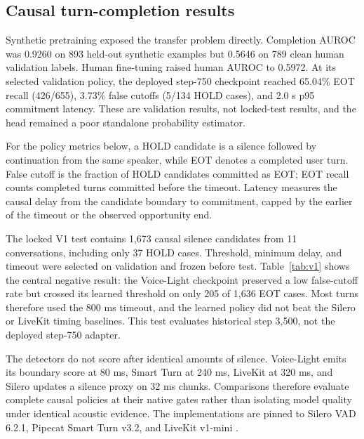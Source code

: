 \documentclass[10pt,twocolumn]{article}
\begin{document}
\subsection{Causal turn-completion results}

Synthetic pretraining exposed the transfer problem directly. Completion AUROC was 0.9260 on 893
held-out synthetic examples but 0.5646 on 789 clean human validation labels. Human fine-tuning
raised human AUROC to 0.5972. At its selected validation policy, the deployed step-750 checkpoint
reached 65.04\% EOT recall (426/655), 3.73\% false cutoffs (5/134 HOLD cases), and 2.0 s p95
commitment latency. These are validation results, not locked-test results, and the head remained a
poor standalone probability estimator.

For the policy metrics below, a HOLD candidate is a silence followed by continuation from the same
speaker, while EOT denotes a completed user turn. False cutoff is the fraction of HOLD candidates
committed as EOT; EOT recall counts completed turns committed before the timeout. Latency measures
the causal delay from the candidate boundary to commitment, capped by the earlier of the timeout or
the observed opportunity end.

The locked V1 test contains 1,673 causal silence candidates from 11 conversations, including only
37 HOLD cases. Threshold, minimum delay, and timeout were selected on validation and frozen before
test. Table~\ref{tab:v1} shows the central negative result: the Voice-Light checkpoint preserved a
low false-cutoff rate but crossed its learned threshold on only 205 of 1,636 EOT cases. Most turns
therefore used the 800 ms timeout, and the learned policy did not beat the Silero or LiveKit timing
baselines. This test evaluates historical step 3,500, not the deployed step-750 adapter.

The detectors do not score after identical amounts of silence. Voice-Light emits its boundary score
at 80 ms, Smart Turn at 240 ms, LiveKit at 320 ms, and Silero updates a silence proxy on 32 ms
chunks. Comparisons therefore evaluate complete causal policies at their native gates rather than
isolating model quality under identical acoustic evidence. The implementations are pinned to
Silero VAD 6.2.1, Pipecat Smart Turn v3.2, and LiveKit v1-mini \cite{silero,smartturn,livekit}.
\end{document}
